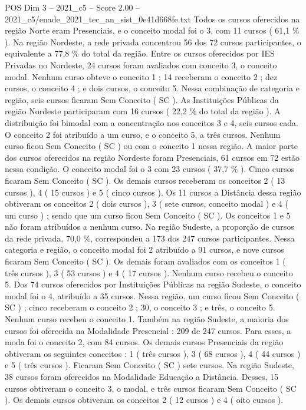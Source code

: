 \begin{textsample}{POS Dim 3 – 2021\_c5 – Score 2.00 – 2021\_c5/enade\_2021\_tec\_an\_sist\_0e41d668fe.txt}
Todos os cursos oferecidos na região Norte eram Presenciais, e o conceito modal foi o 3, com 11 cursos ( 61,1 \% ).
Na região Nordeste, a rede privada concentrou 56 dos 72 cursos participantes, o equivalente a 77,8 \% do total da região.
Entre os cursos oferecidos por IES Privadas no Nordeste, 24 cursos foram avaliados com conceito 3, o conceito modal.
Nenhum curso obteve o conceito 1 ; 14 receberam o conceito 2 ; dez cursos, o conceito 4 ; e dois cursos, o conceito 5.
Nessa combinação de categoria e região, seis cursos ficaram Sem Conceito ( SC ).
As Instituições Públicas da região Nordeste participaram com 16 cursos ( 22,2 \% do total da região ).
A distribuição foi bimodal com a concentração nos conceitos 3 e 4, seis cursos cada.
O conceito 2 foi atribuído a um curso, e o conceito 5, a três cursos.
Nenhum curso ficou Sem Conceito ( SC ) ou com o conceito 1 nessa região.
A maior parte dos cursos oferecidos na região Nordeste foram Presenciais, 61 cursos em 72 estão nessa condição.
O conceito modal foi o 3 com 23 cursos ( 37,7 \% ).
Cinco cursos ficaram Sem Conceito ( SC ).
Os demais cursos receberam os conceitos 2 ( 13 cursos ), 4 ( 15 cursos ) e 5 ( cinco cursos ).
Os 11 cursos a Distância dessa região obtiveram os conceitos 2 ( dois cursos ), 3 ( sete cursos, conceito modal ) e 4 ( um curso ) ; sendo que um curso ficou Sem Conceito ( SC ).
Os conceitos 1 e 5 não foram atribuídos a nenhum curso.
Na região Sudeste, a proporção de cursos da rede privada, 70,0 \%, correspondeu a 173 dos 247 cursos participantes.
Nessa categoria e região, o conceito modal foi 2 atribuído a 91 cursos, e nove cursos ficaram Sem Conceito ( SC ).
Os demais foram avaliados com os conceitos 1 ( três cursos ), 3 ( 53 cursos ) e 4 ( 17 cursos ).
Nenhum curso recebeu o conceito 5.
Dos 74 cursos oferecidos por Instituições Públicas na região Sudeste, o conceito modal foi o 4, atribuído a 35 cursos.
Nessa região, um curso ficou Sem Conceito ( SC ) ; cinco receberam o conceito 2 ; 30, o conceito 3 ; e três, o conceito 5.
Nenhum curso recebeu o conceito 1.
Também na região Sudeste, a maioria dos cursos foi oferecida na Modalidade Presencial : 209 de 247 cursos.
Para esses, a moda foi o conceito 2, com 84 cursos.
Os demais cursos Presenciais da região obtiveram os seguintes conceitos : 1 ( três cursos ), 3 ( 68 cursos ), 4 ( 44 cursos ) e 5 ( três cursos ).
Ficaram Sem Conceito ( SC ) sete cursos.
Na região Sudeste, 38 cursos foram oferecidos na Modalidade Educação a Distância.
Desses, 15 cursos obtiveram o conceito 3, o modal, e três cursos ficaram Sem Conceito ( SC ).
Os demais cursos obtiveram os conceitos 2 ( 12 cursos ) e 4 ( oito cursos ).

\end{textsample}
